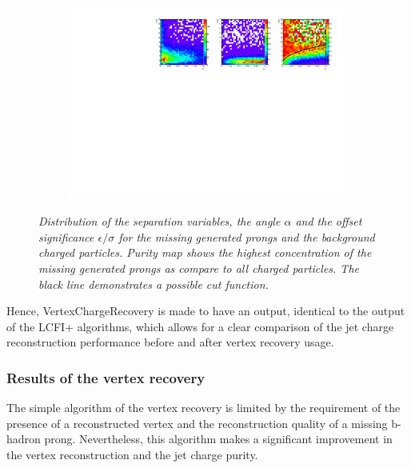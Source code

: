 \begin{figure}
\begin{subfigure}{0.33\textwidth}
		\includegraphics[clip, trim=13.6cm 0cm 0.4cm 0.cm,width=0.99\textwidth]{ILD/plots/recovery-purity.pdf}
		\caption{\label{fig:RecoveryPurity_c_3} }
	\end{subfigure}
	\caption{\sl Distribution of the separation variables, the angle $\alpha$ and the offset significance $\epsilon/\sigma$ for the missing generated prongs and the background charged particles. Purity map shows the highest concentration of the missing generated prongs as compare to all charged particles. The black line demonstrates a possible cut function. }
	
	\label{fig:RecoveryPurity_3}
\end{figure}

Hence, VertexChargeRecovery is made to have an output, identical to the output of the LCFI+ algorithms, which allows for a clear comparison of the jet charge reconstruction performance before and after vertex recovery usage.
\subsubsection{Results of the vertex recovery}

The simple algorithm of the vertex recovery is limited by the requirement of the presence of a reconstructed vertex and the reconstruction quality of a missing b-hadron prong. 
Nevertheless, this algorithm makes a significant improvement in the vertex reconstruction and the jet charge purity.


